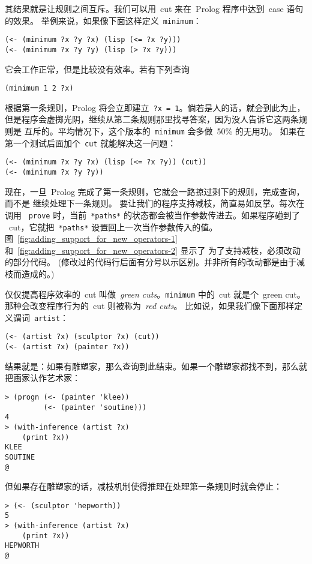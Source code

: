 其结果就是让规则之间互斥。我们可以用~cut 来在~Prolog 程序中达到~case 语句的效果。
举例来说，如果像下面这样定义~\verb|minimum|：
\begin{lstlisting}
(<- (minimum ?x ?y ?x) (lisp (<= ?x ?y)))
(<- (minimum ?x ?y ?y) (lisp (> ?x ?y)))
\end{lstlisting}
它会工作正常，但是比较没有效率。若有下列查询
\begin{lstlisting}
(minimum 1 2 ?x)
\end{lstlisting}

根据第一条规则，Prolog 将会立即建立~\verb|?x = 1|。倘若是人的话，就会到此为止，
但是程序会虚掷光阴，继续从第二条规则那里找寻答案，因为没人告诉它这两条规则是
互斥的。平均情况下，这个版本的~\verb|minimum| 会多做~50\% 的无用功。
如果在第一个测试后面加个~\verb|cut| 就能解决这一问题：
\begin{lstlisting}
(<- (minimum ?x ?y ?x) (lisp (<= ?x ?y)) (cut))
(<- (minimum ?x ?y ?y))
\end{lstlisting}
现在，一旦~Prolog 完成了第一条规则，它就会一路掠过剩下的规则，完成查询，而不是
继续处理下一条规则。
要让我们的程序支持减枝，简直易如反掌。每次在调用
~\verb|prove| 时，当前~\verb|*paths*| 的状态都会被当作参数传进去。如果程序碰到了
~cut，它就把~\verb|*paths*| 设置回上一次当作参数传入的值。
图~\ref{fig:adding_support_for_new_operators-1} 和~\ref{fig:adding_support_for_new_operators-2} 显示了
为了支持减枝，必须改动的部分代码。
(修改过的代码行后面有分号以示区别。并非所有的改动都是由于减枝而造成的。)

仅仅提高程序效率的~cut 叫做~\emph{green cuts}。\verb|minimum| 
中的~cut 就是个~green cut。那种会改变程序行为的~cut 则被称为~\emph{red cuts}。
比如说，如果我们像下面那样定义谓词~\verb|artist|：
\begin{lstlisting}
(<- (artist ?x) (sculptor ?x) (cut))
(<- (artist ?x) (painter ?x))
\end{lstlisting}
结果就是：如果有雕塑家，那么查询到此结束。如果一个雕塑家都找不到，那么就把画家认作艺术家：
\begin{lstlisting}
> (progn (<- (painter 'klee))
         (<- (painter 'soutine)))
4
> (with-inference (artist ?x)
    (print ?x))
KLEE
SOUTINE
@
\end{lstlisting}
但如果存在雕塑家的话，减枝机制使得推理在处理第一条规则时就会停止：
\begin{lstlisting}
> (<- (sculptor 'hepworth))
5
> (with-inference (artist ?x)
    (print ?x))
HEPWORTH
@
\end{lstlisting}

